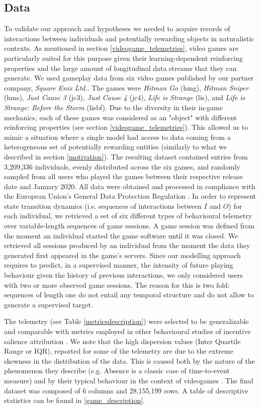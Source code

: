 \subsection{Data}
\label{data_2}
To validate our approach and hypotheses we needed to acquire records of interactions between individuals and potentially rewarding objects in naturalistic contexts. As mentioned in section \ref{videogame_telemetries}, video games are particularly suited for this purpose given their learning-dependent reinforcing properties and the large amount of longitudinal data streams that they can generate. We used gameplay data from  six video games published by our partner company, \textit{Square Enix Ltd.}. The games were \emph{Hitman Go} (hmg), \emph{Hitman Sniper} (hms), \emph{Just Cause 3} (jc3), \emph{Just Cause 4} (jc4), \emph{Life is Strange} (lis), and \emph{Life is Strange: Before the Storm} (lisbf). Due to the diversity in their in-game mechanics, each of these games was considered as an "object" with different reinforcing properties (see section \ref{videogame_telemetries}). This allowed us to mimic a situation where a single model had access to data coming from a heterogeneous set of potentially rewarding entities (similarly to what we described in section \ref{motivation}). The resulting dataset contained entries from 3,209,336 individuals, evenly distributed across the six games, and randomly sampled from all users who played the games between their respective release date and January 2020. All data were obtained and processed in compliance with the European Union's General Data Protection Regulation \cite{EUdataregulations2018}. In order to represent state transition dynamics (i.e. sequences of interactions between $I$ and $O$) for each individual, we retrieved a set of six different types of behavioural telemetry over variable-length sequences of game sessions. A game session was defined from the moment an individual started the game software until it was closed. We retrieved all sessions produced by an individual from the moment the data they generated first appeared in the game's servers. Since our modelling approach requires to predict, in a supervised manner, the intensity of future playing behaviour given the history of previous interactions, we only considered users with two or more observed game sessions. The reason for this is two fold: sequences of length one do not entail any temporal structure and do not allow to generate a supervised target.

The telemetry (see Table \ref{metricsdescription}) were selected to be generalizable and comparable with metrics employed in other behavioural studies of incentive salience attribution \cite{berridge1998role,mcclure2003computational,zhang2009neural}. We note that the high dispersion values (Inter Quartile Range  or IQR), reported for some of the telemetry are due to the extreme skewness in the distribution of the data. This is caused both by the nature of the phenomenon they describe (e.g. Absence is a classic case of time-to-event measure) and by their typical behaviour in the context of videogames \cite{bauckhage2012players}. The final dataset was composed of 6 columns and 28,155,199 rows. A table of descriptive statistics can be found in \ref{game_description}.

